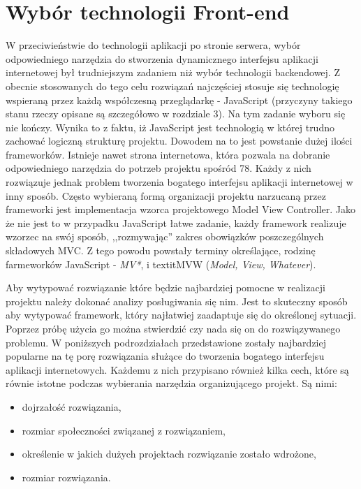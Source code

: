 \section{Wybór technologii Front-end}

W przeciwieństwie do technologii aplikacji po stronie serwera, wybór odpowiedniego narzędzia do stworzenia dynamicznego interfejsu aplikacji internetowej był trudniejszym zadaniem niż wybór technologii backendowej. Z obecnie stosowanych do tego celu rozwiązań najczęściej stosuje się technologię wspieraną przez każdą współczesną przeglądarkę - JavaScript\cite{javascript-book} (przyczyny takiego stanu rzeczy opisane są szczegółowo w rozdziale 3). Na tym zadanie wyboru się nie kończy. Wynika to z faktu, iż JavaScript jest technologią w której trudno zachować logiczną strukturę projektu. Dowodem na to jest powstanie dużej ilości frameworków. Istnieje nawet strona internetowa, która pozwala na dobranie odpowiedniego narzędzia do potrzeb projektu spośród 78\cite{todomvc}. Każdy z nich rozwiązuje jednak problem tworzenia bogatego interfejsu aplikacji internetowej w inny sposób. Często wybieraną formą organizacji projektu narzucaną przez frameworki jest implementacja wzorca projektowego Model View Controller. Jako że nie jest to w przypadku JavaScript łatwe zadanie, każdy framework realizuje wzorzec na swój sposób, ,,rozmywając'' zakres obowiązków poszczególnych składowych MVC. Z tego powodu powstały terminy określające, rodzinę farmeworków JavaScript - \textit{MV*}, i textit{MVW} (\textit{Model, View, Whatever}). 

Aby wytypować rozwiązanie które będzie najbardziej pomocne w realizacji projektu należy dokonać analizy posługiwania się nim. Jest to skuteczny sposób aby wytypować framework, który najłatwiej zaadaptuje się do określonej sytuacji\cite{todomvc}. Poprzez próbę użycia go można stwierdzić czy nada się on do rozwiązywanego problemu. 
W poniższych podrozdziałach przedstawione zostały najbardziej popularne na tę porę rozwiązania służące do tworzenia bogatego interfejsu aplikacji internetowych. Każdemu z nich przypisano również kilka cech, które są równie istotne podczas wybierania narzędzia organizującego projekt. Są nimi:
\begin{itemize}
\item dojrzałość rozwiązania,
\item rozmiar społeczności związanej z rozwiązaniem,
\item określenie w jakich dużych projektach rozwiązanie zostało wdrożone,
\item rozmiar rozwiązania.
\end{itemize}

